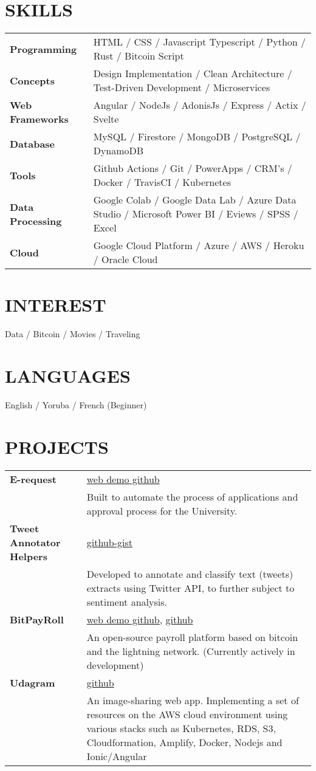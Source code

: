 \documentclass[a4paper,12pt]{article}
\begin{document}
\section{SKILLS}

\begin{tabularx}{\linewidth}{@{}l X@{}}
\textbf{Programming} & HTML / CSS / Javascript Typescript / Python / Rust / Bitcoin Script \\
\textbf{Concepts} & Design Implementation / Clean Architecture / Test-Driven Development / Microservices \\
\textbf{Web Frameworks} & Angular / NodeJs / AdonisJs / Express / Actix / Svelte \\
\textbf{Database} & MySQL / Firestore / MongoDB / PostgreSQL / DynamoDB \\
\textbf{Tools} & Github Actions / Git / PowerApps / CRM's / Docker / TravisCI / Kubernetes \\
\textbf{Data Processing} & Google Colab / Google Data Lab / Azure Data Studio / Microsoft Power BI / Eviews / SPSS / Excel \\
\textbf{Cloud} & Google Cloud Platform / Azure / AWS / Heroku / Oracle Cloud
\end{tabularx}

\section{INTEREST}
Data / Bitcoin / Movies / Traveling

\section{LANGUAGES}
English / Yoruba / French (Beginner)

\section{PROJECTS}

\begin{tabularx}{\linewidth}{@{}l X@{}}
\textbf{E-request} & \hfill \href{https://web-demo-github.com}{web demo github} \\
& Built to automate the process of applications and approval process for the University. \\[10pt]
\textbf{Tweet Annotator Helpers} & \hfill \href{https://github-gist.com}{github-gist} \\
& Developed to annotate and classify text (tweets) extracts using Twitter API, to further subject to sentiment analysis. \\[10pt]
\textbf{BitPayRoll} & \hfill \href{https://web-demo-github.com}{web demo github}, \href{https://github.com}{github} \\
& An open-source payroll platform based on bitcoin and the lightning network. (Currently actively in development) \\[10pt]
\textbf{Udagram} & \hfill \href{https://github.com}{github} \\
& An image-sharing web app. Implementing a set of resources on the AWS cloud environment using various stacks such as Kubernetes, RDS, S3, Cloudformation, Amplify, Docker, Nodejs and Ionic/Angular
\end{tabularx}
\end{document}
